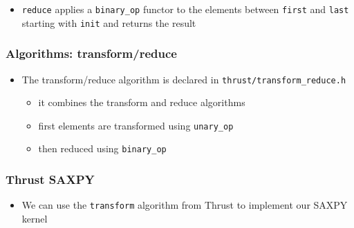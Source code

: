 \begin{itemize}
\itemsep1pt\parskip0pt
\item
  \texttt{reduce} applies a \texttt{binary\_op} functor to the elements
  between \texttt{first} and \texttt{last} starting with \texttt{init}
  and returns the result
\end{itemize}

\subsubsection{Algorithms:
transform/reduce}\label{algorithms-transformreduce}

\begin{itemize}
\itemsep1pt\parskip0pt
\item
  The transform/reduce algorithm is declared in
  \texttt{thrust/transform\_reduce.h}

  \begin{itemize}
  \itemsep1pt\parskip0pt
  \item
    it combines the transform and reduce algorithms
  \item
    first elements are transformed using \texttt{unary\_op}
  \item
    then reduced using \texttt{binary\_op}
  \end{itemize}
\end{itemize}

\begin{Shaded}
\begin{Highlighting}[]
\NormalTok{)}
 \NormalTok{;}

\end{Highlighting}
\end{Shaded}

\subsubsection{Thrust SAXPY}\label{thrust-saxpy}

\begin{itemize}
\itemsep1pt\parskip0pt
\item
  We can use the \texttt{transform} algorithm from Thrust to implement
  our SAXPY kernel
\end{itemize}

